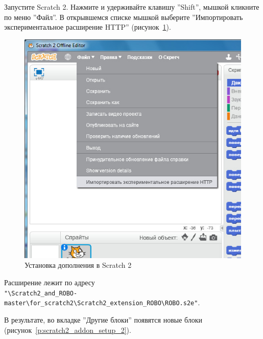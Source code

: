 Запустите Scratch 2. Нажмите и удерживайте клавишу ''Shift'', мышкой кликните по меню ''Файл''. В открывшемся списке мышкой выберите ''Импортировать экспериментальное расширение HTTP'' (рисунок~\ref{p:scratch2_addon_setup_1}).

\begin{figure}[H]\center
  \captionsetup{singlelinecheck=true} %
  \includegraphics*[scale=0.7]{about/images/scratch2_addon_setup_1}
  \caption{Установка дополнения в Scratch 2} \label{p:scratch2_addon_setup_1}
\end{figure}

Расширение лежит по адресу \\ \verb|"\Scratch2_and_ROBO-master\for_scratch2\Scratch2_extension_ROBO\ROBO.s2e"|.

В результате, во вкладке ''Другие блоки'' появятся новые блоки (рисунок~\ref{p:scratch2_addon_setup_2}).


